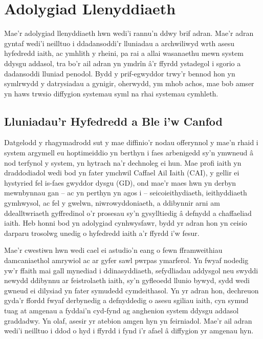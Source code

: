 \chapter{Adolygiad Llenyddiaeth}

Mae'r adolygiad llenyddiaeth hwn wedi'i rannu'n ddwy brif adran. Mae'r adran gyntaf wedi'i neilltuo i ddadansoddi'r lluniadau a archwiliwyd wrth asesu hyfedredd iaith, ac ymhlith y rheini, pa rai a allai wasanaethu mewn system ddysgu addasol, tra bo'r ail adran yn ymdrîn â'r ffyrdd ystadegol i sgorio a dadansoddi lluniad penodol. Bydd y prif-egwyddor trwy'r bennod hon yn symlrwydd y datrysiadau a gynigir, oherwydd, ym mhob achos, mae bob amser yn haws trwsio diffygion systemau syml na rhai systemau cymhleth.

\section{Lluniadau'r Hyfedredd a Ble i'w Canfod}

Datgelodd y rhagymadrodd sut y mae diffinio'r nodau offerynnol y mae'n rhaid i system argymell eu hoptimeiddio yn berthyn i faes arbenigedd sy'n ymwneud â nod terfynol y system, yn hytrach na'r dechnoleg ei hun. Mae profi iaith yn draddodiadol wedi bod yn fater ymchwil Caffael Ail Iaith (CAI), y gellir ei hystyried fel is-faes gwyddor dysgu (GD), ond mae'r maes hwn yn derbyn mewnbynnau gan – ac yn perthyn yn agos i – seicoieithydiaeth, ieithyddiaeth gymhwysol, ac fel y gwelwn, niwrowyddoniaeth, a ddibynnir arni am ddealltwriaeth gyffredinol o'r prosesau sy'n gysylltiedig â defnydd a chaffaeliad iaith. Heb honni bod yn adolygiad cynhwysfawr, bydd yr adran hon yn ceisio darparu trosolwg unedig o hyfedredd iaith a'r ffyrdd i'w fesur.

Mae'r cwestiwn hwn wedi cael ei astudio'n eang o fewn fframweithiau damcaniaethol amrywiol ac ar gyfer sawl pwrpas ymarferol. Yn fwyaf nodedig yw'r ffaith mai gall mynediad i ddinasyddiaeth, sefydliadau addysgol neu swyddi newydd ddibynnu ar feistrolaeth iaith, sy'n gyfleoedd llunio bywyd, sydd wedi gwneud ei dilysiad yn fater symudedd cymdeithasol. Yn yr adran hon, dechreuon gyda'r ffordd fwyaf derbynedig a defnyddedig o asesu sgiliau iaith, cyn symud tuag at amgenau a fyddai'n cyd-fynd ag anghenion system ddysgu addasol graddadwy. Yn olaf, asesir yr atebion amgen hyn yn feirniadol. Mae'r ail adran wedi'i neilltuo i ddod o hyd i ffyrdd i fynd i'r afael â diffygion yr amgenau hyn.


